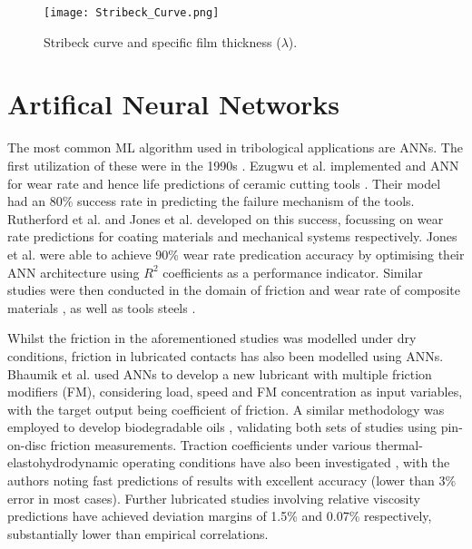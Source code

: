 \begin{figure}
	\centerline{\texttt{[image: Stribeck\_Curve.png]}}
	\caption[Stribeck curve and specific film thickness values.]{Stribeck curve and specific film thickness ($\lambda$). \cite{Ali2015}}
	\label{Stribeck_Curve}
\end{figure}

\section{Artifical Neural Networks}

The most common ML algorithm used in tribological applications are ANNs. The first utilization of these were in the 1990s \cite{Argatov2019}. Ezugwu et al. implemented and ANN for wear rate and hence life predictions of ceramic cutting tools \cite{Ezugwu1995}. Their model had an 80\% success rate in predicting the failure mechanism of the tools. Rutherford et al. \cite{Rutherford1996} and Jones et al. \cite{Jones1997} developed on this success, focussing on wear rate predictions for coating materials and mechanical systems respectively. Jones et al. were able to achieve 90\% wear rate predication accuracy by optimising their ANN architecture using $R^2$ coefficients as a performance indicator. Similar studies were then conducted in the domain of friction and wear rate of composite materials \cite{Genel2003} \cite{Hayajneh2009} \cite{Zhang2002}, as well as tools steels \cite{Cavaleri2019}. 

Whilst the friction in the aforementioned studies was modelled under dry conditions, friction in lubricated contacts has also been modelled using ANNs. Bhaumik et al. \cite{Bhaumik2019a} used ANNs to develop a new lubricant with multiple friction modifiers (FM), considering load, speed and FM concentration as input variables, with the target output being coefficient of friction. A similar methodology was employed to develop biodegradable oils \cite{Bhaumik2019a}, validating both sets of studies using pin-on-disc friction measurements. Traction coefficients under various thermal-elastohydrodynamic operating conditions have also been investigated \cite{EchavarriOtero2014}, with the authors noting fast predictions of results with excellent accuracy (lower than 3\% error in most cases). Further lubricated studies involving relative viscosity predictions \cite{Afrand2016} \cite{HemmatEsfe2018} have achieved deviation margins of 1.5\% and 0.07\% respectively, substantially lower than empirical correlations.

